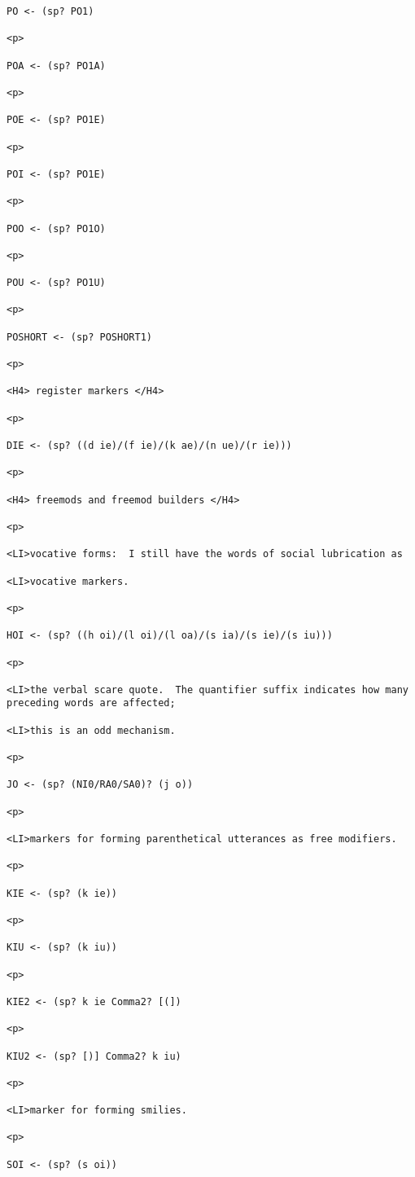 \documentclass[12pt]{article}
\begin{document}
\begin{lstlisting}
PO <- (sp? PO1)

<p>

POA <- (sp? PO1A)

<p>

POE <- (sp? PO1E)

<p>

POI <- (sp? PO1E)

<p>

POO <- (sp? PO1O)

<p>

POU <- (sp? PO1U)

<p>

POSHORT <- (sp? POSHORT1)

<p>

<H4> register markers </H4>

<p>

DIE <- (sp? ((d ie)/(f ie)/(k ae)/(n ue)/(r ie)))

<p>

<H4> freemods and freemod builders </H4>

<p>

<LI>vocative forms:  I still have the words of social lubrication as

<LI>vocative markers.

<p>

HOI <- (sp? ((h oi)/(l oi)/(l oa)/(s ia)/(s ie)/(s iu)))

<p>

<LI>the verbal scare quote.  The quantifier suffix indicates how many preceding words are affected;

<LI>this is an odd mechanism.

<p>

JO <- (sp? (NI0/RA0/SA0)? (j o))

<p>

<LI>markers for forming parenthetical utterances as free modifiers.

<p>

KIE <- (sp? (k ie))

<p>

KIU <- (sp? (k iu))

<p>

KIE2 <- (sp? k ie Comma2? [(])

<p>

KIU2 <- (sp? [)] Comma2? k iu)

<p>

<LI>marker for forming smilies.

<p>

SOI <- (sp? (s oi))


\end{lstlisting}
\end{document}
